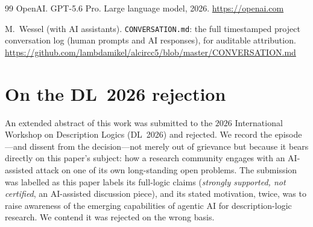\documentclass[11pt]{article}
\theoremstyle{plain}
\theoremstyle{definition}
\begin{document}
\begin{thebibliography}{99}
OpenAI.
\newblock GPT-5.6 Pro.
\newblock Large language model, 2026.
\newblock \url{https://openai.com}

M.\ Wessel (with AI assistants).
\newblock \texttt{CONVERSATION.md}: the full timestamped project
  conversation log (human prompts and AI responses), for auditable
  attribution.
\newblock \url{https://github.com/lambdamikel/alcircc5/blob/master/CONVERSATION.md}

\end{thebibliography}

\newpage
\appendix
\section{On the DL~2026 rejection}
\label{app:dl2026}

An extended abstract of this work was submitted to the $2026$
International Workshop on Description Logics (DL~2026) and rejected. We
record the episode---and dissent from the decision---not merely out of
grievance but because it bears directly on this paper's subject: how a
research community engages with an AI-assisted attack on one of its own
long-standing open problems. The submission was labelled as this paper
labels its full-logic claims (\emph{strongly supported, not certified}, an AI-assisted
discussion piece), and its stated motivation, twice, was to raise
awareness of the emerging capabilities of agentic AI for description-logic
research. We contend it was rejected on the wrong basis.
\end{document}
